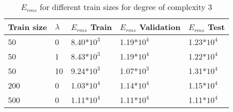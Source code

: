 \def\arraystretch{1.25}
\begin{table}[H]
\centering
\begin{tabular}{l l l l l}
\hline
\hline
\textbf{Train size} & \textbf{$\lambda$} & \textbf{$E_{rms}$ Train} & \textbf{$E_{rms}$ Validation} & \textbf{$E_{rms}$ Test}\\
\hline
\hline
50 & 0 & 8.40*$10^3$ & 1.19*$10^4$ & 1.23*$10^4$  \\
50 & 1 & 8.43*$10^3$ & 1.19*$10^4$ & 1.22*$10^4$ \\
50 & 10 & 9.24*$10^3$ & 1.07*$10^3$ & 1.31*$10^4$ \\
200 & 0 & 1.03*$10^4$ & 1.14*$10^4$ & 1.15*$ 10^4$  \\
500 & 0 & 1.11*$10^4$ & 1.11*$10^4$ & 1.11*$10^4$\\
\hline
\end{tabular}
\caption{$E_{rms}$ for different train sizes for degree of complexity 3}
\end{table}

